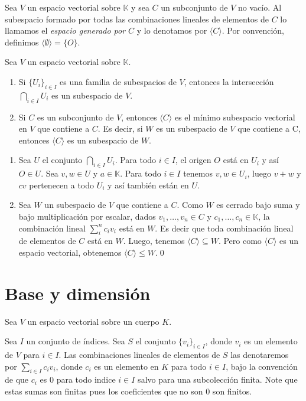 \begin{defn}
Sea $V$ un espacio vectorial sobre $\mathbb{K}$ y sea $C$ un subconjunto de $V$ no vac\'io. Al subespacio formado por todas las combinaciones lineales de elementos de $C$ lo llamamos el \emph{espacio generado por $C$} y lo denotamos por $\langle C \rangle$. Por convenci\'on, definimos $\langle \emptyset\rangle=\{O\}$.
\end{defn}

\begin{prop}\label{propunion}
Sea $V$ un espacio vectorial sobre $\mathbb{K}$.
\begin{enumerate}
\item Si $\{U_i\}_{i\in I}$ es una familia de subespacios de $V$, entonces la intersecci\'on $\bigcap_{i \in I} U_i$ es un subespacio de $V$.
\item Si $C$ es un subconjunto de $V$, entonces $\langle C\rangle$ es el m\'inimo subespacio vectorial en $V$ que contiene a $C$. Es decir, si $W$ es un subespacio de $V$ que contiene a C, entonces $\langle C\rangle$ es un subespacio de $W$.
\end{enumerate}
\end{prop}

\dem
\begin{enumerate}
\item Sea $U$ el conjunto $\bigcap_{i\in I} U_i$. Para todo $i\in I$, el origen $O$ está en $U_i$ y así $O\in U$. Sea $v,w\in U$ y $a\in \mathbb{K}$. Para todo $i \in I$ tenemos $v,w\in U_i$, luego $v+w$ y $cv$ pertenecen a todo $U_i$ y as\'i tambi\'en est\'an en $U$.
\item Sea  $W$ un subespacio de $V$ que contiene a $C$. Como $W$ es cerrado bajo suma y bajo multiplicaci\'on por escalar, dados $v_1,\ldots,v_n\in C$ y $c_1,\ldots,c_n\in \mathbb{K}$, la combinaci\'on lineal $\sum_i^{n} c_iv_i$ est\'a en $W$. Es decir que toda combinaci\'on lineal de elementos de $C$ est\'a en $W$. Luego, tenemos $\langle C\rangle \subseteq W$. Pero como $\langle C\rangle$ es un espacio vectorial, obtenemos $\langle C\rangle \le W$.\qed
\end{enumerate}

\section{Base y dimensi\'on}

Sea $V$ un espacio vectorial sobre un cuerpo $K$.

\begin{nota}
Sea $I$ un conjunto de \'indices. Sea $S$ el conjunto $\{v_i\}_{i\in I}$, donde $v_i$ es un elemento de $V$ para $i\in I$. Las combinaciones lineales de elementos de $S$ las denotaremos por
$\sum_{i\in I} c_iv_i$, donde $c_i$ es un elemento en $K$ para todo $i\in I$, bajo la convenci\'on de que $c_i$ es $0$ para todo indice $i\in I$ salvo para una subcolecci\'on finita. Note que estas sumas son finitas pues los coeficientes que no son $0$ son finitos.
\end{nota}


